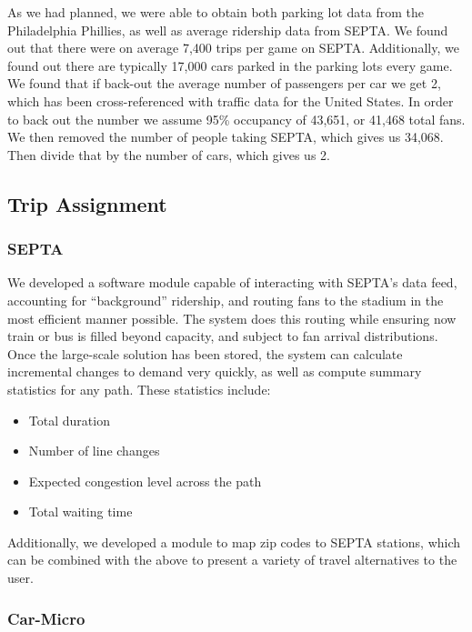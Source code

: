 As we had planned, we were able to obtain both parking lot data from
the Philadelphia Phillies, as well as average ridership data from
SEPTA. We found out that there were on average 7,400 trips per game on
SEPTA. Additionally, we found out there are typically 17,000 cars
parked in the parking lots every game. We found that if back-out the
average number of passengers per car we get 2, which has been
cross-referenced with traffic data for the United States. In order to
back out the number we assume 95\% occupancy of 43,651, or 41,468
total fans. We then removed the number of people taking SEPTA, which
gives us 34,068. Then divide that by the number of cars, which gives
us 2.


\subsection{Trip Assignment}

\subsubsection{SEPTA}

We developed a software module capable of interacting with SEPTA's
data feed, accounting for ``background'' ridership, and routing fans
to the stadium in the most efficient manner possible. The system does
this routing while ensuring now train or bus is filled beyond
capacity, and subject to fan arrival distributions. Once the
large-scale solution has been stored, the system can calculate
incremental changes to demand very quickly, as well as compute summary
statistics for any path. These statistics include:

\begin{itemize}
  \item Total duration
  \item Number of line changes
  \item Expected congestion level across the path
  \item Total waiting time
\end{itemize}

Additionally, we developed a module to map zip codes to SEPTA
stations, which can be combined with the above to present a variety of
travel alternatives to the user.

\subsubsection{Car-Micro}

